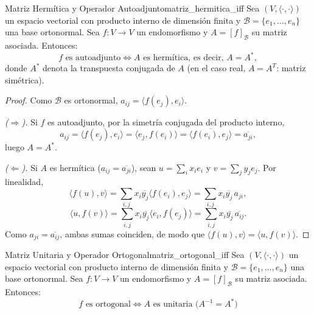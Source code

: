 \documentclass[11pt, a4paper]{article}
\begin{document}
\begin{proposicion}{Matriz Hermítica y Operador Autoadjunto}{matriz_hermitica_iff}
Sea $(V, \langle \cdot, \cdot \rangle)$ un espacio vectorial con producto interno de dimensión finita y $\mathcal{B} = \{e_1, \dots, e_n\}$ una base ortonormal.
Sea $f: V \to V$ un endomorfismo y $A = [f]_\mathcal{B}$ su matriz asociada.
Entonces:
\[ f \text{ es autoadjunto} \iff A \text{ es hermítica, es decir, } A = A^*, \]
donde $A^*$ denota la transpuesta conjugada de $A$ (en el caso real, $A = A^T$: matriz simétrica).
\end{proposicion}

\begin{proof}
Como $\mathcal{B}$ es ortonormal, $a_{ij} = \langle f(e_j), e_i \rangle$.

\textit{($\Rightarrow$).} Si $f$ es autoadjunto, por la simetría conjugada del producto interno,
\[ a_{ij} = \langle f(e_j), e_i \rangle = \langle e_j, f(e_i) \rangle = \overline{\langle f(e_i), e_j \rangle} = \overline{a_{ji}}, \]
luego $A = A^*$.

\textit{($\Leftarrow$).} Si $A$ es hermítica ($a_{ij} = \overline{a_{ji}}$), sean $u = \sum_i x_i e_i$ y $v = \sum_j y_j e_j$. Por linealidad,
\[ \langle f(u), v \rangle = \sum_{i,j} x_i \overline{y_j} \langle f(e_i), e_j \rangle = \sum_{i,j} x_i \overline{y_j}\, a_{ji}, \]
\[ \langle u, f(v) \rangle = \sum_{i,j} x_i \overline{y_j} \langle e_i, f(e_j) \rangle = \sum_{i,j} x_i \overline{y_j}\, \overline{a_{ij}}. \]
Como $a_{ji} = \overline{a_{ij}}$, ambas sumas coinciden, de modo que $\langle f(u), v \rangle = \langle u, f(v) \rangle$.
\end{proof}

\begin{proposicion}{Matriz Unitaria y Operador Ortogonal}{matriz_ortogonal_iff}
Sea $(V, \langle \cdot, \cdot \rangle)$ un espacio vectorial con producto interno de dimensión finita y $\mathcal{B} = \{e_1, \dots, e_n\}$ una base ortonormal.
Sea $f: V \to V$ un endomorfismo y $A = [f]_\mathcal{B}$ su matriz asociada.
Entonces:
\[ f \text{ es ortogonal} \iff A \text{ es unitaria (} A^{-1} = A^* \text{)} \]
\end{proposicion}
\end{document}
